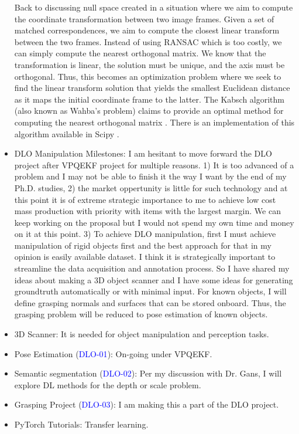 \documentclass[11pt]{article}
\begin{document}
\begin{itemize}
    Back to discussing null space created in a situation where we aim to compute
    the coordinate transformation between two image frames. Given a set of
    matched correspondences, we aim to compute the closest linear transform
    between the two frames. Instead of using RANSAC which is too costly, we can
    simply compute the nearest orthogonal matrix. We know that the
    transformation is linear, the solution must be unique, and the axis must be
    orthogonal. Thus, this becomes an optimization problem where we seek to
    find the linear transform solution that yields the smallest Euclidean
    distance as it maps the initial coordinate frame to the latter. The Kabsch
    algorithm (also known as Wahba's problem) claims to provide an optimal
    method for computing the nearest orthogonal matrix
    \cite{kabsch1978discussion}. There is an
    implementation of this algorithm available in Scipy \cite{scipyspa85:online}.



    \item DLO Manipulation Milestones: I am hesitant to move forward the DLO
    project after VPQEKF project for multiple reasons. 1) It is too advanced of
    a problem and I may not be able to finish it the way I want by the end of my
    Ph.D. studies, 2) the market oppertunity is little for such technology and
    at this point it is of extreme strategic importance to me to achieve low cost
    mass production with priority with items with the largest margin. We can
    keep working on the proposal but I would not spend my own time and money on
    it at this point. 3) To achieve DLO manipulation, first I must achieve
    manipulation of rigid objects first and the best approach for that in my
    opinion is easily available dataset. I think it is strategically important to
    streamline the data acquisition and annotation process. So I have shared
    my ideas about making a 3D object scanner and I have some ideas for
    generating groundtruth automatically or with minimal input. For known objects,
    I will define grasping normals and surfaces that can be stored onboard. Thus,
    the grasping problem will be reduced to pose estimation of known objects.


    \item 3D Scanner: It is needed for object manipulation and perception tasks.
    \item Pose Estimation (\textcolor{blue}{DLO-01}): On-going under VPQEKF.
    \item Semantic segmentation (\textcolor{blue}{DLO-02}): Per my discussion with Dr. Gans, I
    will explore DL methods for the depth or scale problem.
    \item Grasping Project (\textcolor{blue}{DLO-03}): I am making this a part of the DLO project.
    \item PyTorch Tutorials: Transfer learning.

  \end{itemize}
\end{document}
